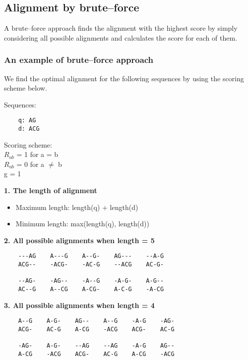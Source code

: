 %
%

%
%
\subsection{Alignment by brute--force}
A brute--force approach finds the alignment with the highest score by simply considering all possible alignments and calculates the score for each of them.

%
%
\subsubsection*{An example of brute--force approach}
We find the optimal alignment for the following sequences by using the scoring scheme below.

\begin{multicols}{2}
Sequences:
\begin{verbatim}
    q: AG
    d: ACG
\end{verbatim}
\vfill\null
\columnbreak

\noindent Scoring scheme: \\ 
$R_{ab}$ = 1 for a = b \\ 
$R_{ab}$ = 0 for a $\neq$ b \\ 
g = 1

\end{multicols} 

\noindent \textbf{1. The length of alignment}
\begin{itemize}
\item Maximum length: length(q) + length(d)
\item Minimum length: max(length(q), length(d))
\end{itemize}
\medskip 

\noindent \textbf{2. All possible alignments when length = 5}
\begin{verbatim}
    ---AG    A---G    A--G-    AG---    --A-G
    ACG--    -ACG-    -AC-G    --ACG    AC-G-

    --AG-    -AG--    -A--G    -A-G-    A-G--
    AC--G    A--CG    A-CG-    A-C-G    -A-CG
\end{verbatim}
\medskip

\noindent \textbf{3. All possible alignments when length = 4}
\begin{verbatim}
    A--G    A-G-    AG--    A--G    -A-G    -AG-
    ACG-    AC-G    A-CG    -ACG    ACG-    AC-G

    -AG-    A-G-    --AG    --AG    -A-G    AG--
    A-CG    -ACG    ACG-    AC-G    A-CG    -ACG
\end{verbatim}
\medskip

